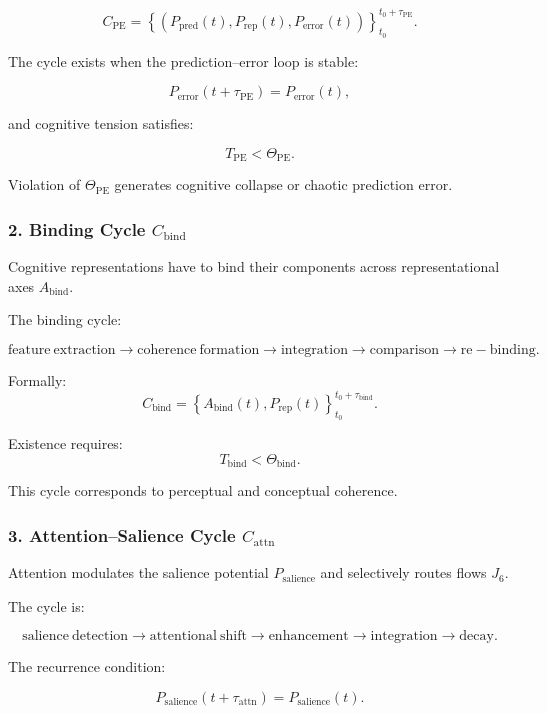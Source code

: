 \[
 C_{\mathrm{PE}} = 
 \left\{
   (P_{\mathrm{pred}}(t),
    P_{\mathrm{rep}}(t),
    P_{\mathrm{error}}(t))
 \right\}_{t_0}^{t_0+\tau_{\mathrm{PE}}}.
\]

The cycle exists when the prediction–error loop is stable:

\[
 P_{\mathrm{error}}(t+\tau_{\mathrm{PE}}) = P_{\mathrm{error}}(t),
\]

and cognitive tension satisfies:

\[
 T_{\mathrm{PE}} < \Theta_{\mathrm{PE}}.
\]

Violation of $\Theta_{\mathrm{PE}}$ generates cognitive collapse or chaotic
prediction error.

\subsubsection{2. Binding Cycle $C_{\mathrm{bind}}$}

Cognitive representations have to bind their components across
representational axes $A_{\mathrm{bind}}$.

The binding cycle:

\[
 \mathrm{feature\ extraction}
 \to
 \mathrm{coherence\ formation}
 \to
 \mathrm{integration}
 \to
 \mathrm{comparison}
 \to
 \mathrm{re-binding}.
\]

Formally:
\[
 C_{\mathrm{bind}} =
 \left\{
   A_{\mathrm{bind}}(t), P_{\mathrm{rep}}(t)
 \right\}_{t_0}^{t_0+\tau_{\mathrm{bind}}}.
\]

Existence requires:
\[
 T_{\mathrm{bind}} < \Theta_{\mathrm{bind}}.
\]

This cycle corresponds to perceptual and conceptual coherence.

\subsubsection{3. Attention–Salience Cycle $C_{\mathrm{attn}}$}

Attention modulates the salience potential $P_{\mathrm{salience}}$ and
selectively routes flows $J_6$.

The cycle is:

\[
  \mathrm{salience\ detection}
  \to
  \mathrm{attentional\ shift}
  \to
  \mathrm{enhancement}
  \to
  \mathrm{integration}
  \to
  \mathrm{decay}.
\]

The recurrence condition:

\[
  P_{\mathrm{salience}}(t+\tau_{\mathrm{attn}}) = P_{\mathrm{salience}}(t).
\]

